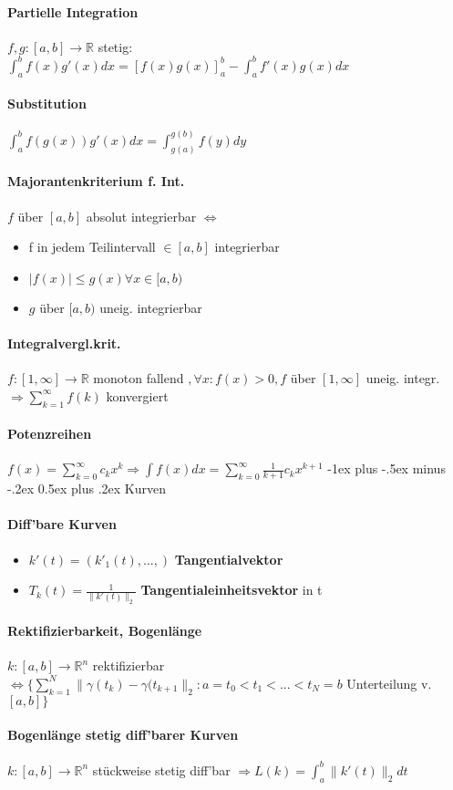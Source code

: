 \documentclass[paper=a4,paper=landscape, fontsize=6pt,DIV=25, twoside]{scrartcl}
\makeatletter
\newcommand{\real}{{\mathbb{R}}}
\renewcommand{\section}{\@startsection{section}{1}{0mm}%
                                {-1ex plus -.5ex minus -.2ex}%
                                {0.5ex plus .2ex}%
                                {\normalfont\large\bfseries}}
\makeatother
\begin{document}
\begin{multicols*}{4}
\paragraph{Partielle Integration}
$f,g: [a,b] \rightarrow \real$ stetig: $\int_{a}^{b}f(x)g'(x)dx=[f(x)g(x)]_a^b-\int_{a}^{b}f'(x)g(x) dx$
\paragraph{Substitution}
$\int_{a}^{b}f(g(x))g'(x)dx=\int_{g(a)}^{g(b)}f(y)dy$
\paragraph{Majorantenkriterium f. Int.}
$f$ über $[a,b]$ absolut integrierbar $\Leftrightarrow$
\begin{itemize}
	\item f in jedem Teilintervall $\in [a,b]$ integrierbar
	\item $\lvert f(x) \rvert \leq g(x) \forall x \in [a,b)$
	\item $g$ über $[a,b)$ uneig. integrierbar
\end{itemize}
\paragraph{Integralvergl.krit.}
$f:[1,\infty]\rightarrow\real$ monoton fallend $, \forall x: f(x)>0, f$ über $[1,\infty]$ uneig. integr. $\Rightarrow \sum_{k=1}^{\infty}f(k)$ konvergiert
\paragraph{Potenzreihen}
$f(x)=\sum_{k=0}^{\infty}c_kx^k \Rightarrow \int f(x)dx=\sum_{k=0}^{\infty}\frac{1}{k+1}c_kx^{k+1}$
\section{Kurven}
\paragraph{Diff'bare Kurven}
\begin{itemize}
	\item $k'(t)=(k'_1(t),...,)$ \textbf{Tangentialvektor}
	\item $T_k(t)=\frac{1}{\lVert k'(t)\rVert_2}$ \textbf{Tangentialeinheitsvektor} in t
\end{itemize}
\paragraph{Rektifizierbarkeit, Bogenlänge}
$k:[a,b]\rightarrow \real^n$ rektifizierbar $\Leftrightarrow \{\sum_{k=1}^{N}\lVert\gamma(t_k)-\gamma(t_{k+1}\rVert_2: a = t_0 < t_1 < ... < t_N = b$ Unterteilung v. $[a,b]\}$
\paragraph{Bogenlänge stetig diff'barer Kurven}
$k: [a,b]\rightarrow \real^n$ stückweise stetig diff'bar $\Rightarrow L(k)=\int_{a}^{b}\lVert k'(t)\rVert_2 dt$

\end{multicols*}
\end{document}
